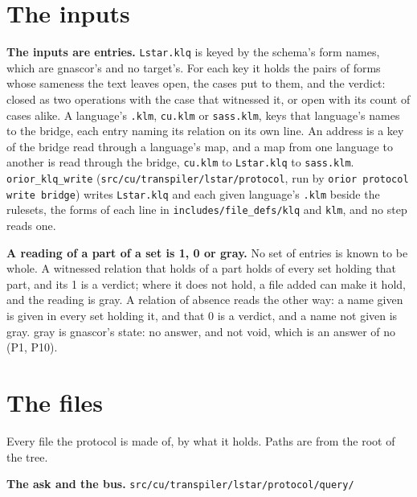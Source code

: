 \section{\texorpdfstring{The inputs}{The inputs}}

\textbf{The inputs are entries.} \texttt{Lstar.\allowbreak{}klq} is keyed by the schema's form names, which are gnascor's and no target's. For each key it holds the pairs of forms whose sameness the text leaves open, the cases put to them, and the verdict: closed as two operations with the case that witnessed it, or open with its count of cases alike. A language's \texttt{.\allowbreak{}klm}, \texttt{cu.\allowbreak{}klm} or \texttt{sass.\allowbreak{}klm}, keys that language's names to the bridge, each entry naming its relation on its own line. An address is a key of the bridge read through a language's map, and a map from one language to another is read through the bridge, \texttt{cu.\allowbreak{}klm} to \texttt{Lstar.\allowbreak{}klq} to \texttt{sass.\allowbreak{}klm}. \texttt{orior\_\allowbreak{}klq\_\allowbreak{}write} (\texttt{src/\allowbreak{}cu/\allowbreak{}transpiler/\allowbreak{}lstar/\allowbreak{}protocol}, run by \texttt{orior protocol write bridge}) writes \texttt{Lstar.\allowbreak{}klq} and each given language's \texttt{.\allowbreak{}klm} beside the rulesets, the forms of each line in \texttt{includes/\allowbreak{}file\_\allowbreak{}defs/\allowbreak{}klq} and \texttt{klm}, and no step reads one.

\textbf{A reading of a part of a set is 1, 0 or gray.} No set of entries is known to be whole. A witnessed relation that holds of a part holds of every set holding that part, and its 1 is a verdict; where it does not hold, a file added can make it hold, and the reading is gray. A relation of absence reads the other way: a name given is given in every set holding it, and that 0 is a verdict, and a name not given is gray. gray is gnascor's state: no answer, and not void, which is an answer of no (P1, P10).

\section{\texorpdfstring{The files}{The files}}

Every file the protocol is made of, by what it holds. Paths are from the root of the tree.

\textbf{The ask and the bus.} \texttt{src/\allowbreak{}cu/\allowbreak{}transpiler/\allowbreak{}lstar/\allowbreak{}protocol/\allowbreak{}query/\allowbreak{}}

